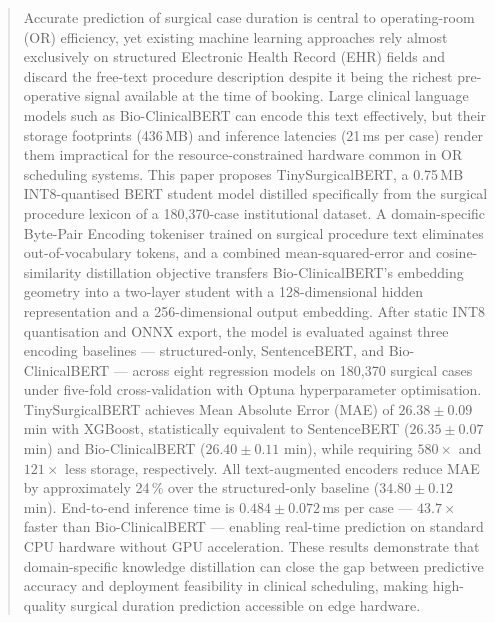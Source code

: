 \documentclass[3p]{elsarticle}
\begin{document}
\begin{frontmatter}
\begin{abstract}
Accurate prediction of surgical case duration is central to operating-room (OR) efficiency, yet existing machine learning approaches rely almost exclusively on structured Electronic Health Record (EHR) fields and discard the free-text procedure description despite it being the richest pre-operative signal available at the time of booking. Large clinical language models such as Bio-ClinicalBERT can encode this text effectively, but their storage footprints (436\,MB) and inference latencies (21\,ms per case) render them impractical for the resource-constrained hardware common in OR scheduling systems. This paper proposes TinySurgicalBERT, a 0.75\,MB INT8-quantised BERT student model distilled specifically from the surgical procedure lexicon of a 180{,}370-case institutional dataset. A domain-specific Byte-Pair Encoding tokeniser trained on surgical procedure text eliminates out-of-vocabulary tokens, and a combined mean-squared-error and cosine-similarity distillation objective transfers Bio-ClinicalBERT's embedding geometry into a two-layer student with a 128-dimensional hidden representation and a 256-dimensional output embedding. After static INT8 quantisation and ONNX export, the model is evaluated against three encoding baselines — structured-only, SentenceBERT, and Bio-ClinicalBERT — across eight regression models on 180{,}370 surgical cases under five-fold cross-validation with Optuna hyperparameter optimisation. TinySurgicalBERT achieves Mean Absolute Error (MAE) of $26.38 \pm 0.09$ min with XGBoost, statistically equivalent to SentenceBERT ($26.35 \pm 0.07$ min) and Bio-ClinicalBERT ($26.40 \pm 0.11$ min), while requiring $580\times$ and $121\times$ less storage, respectively. All text-augmented encoders reduce MAE by approximately 24\,\% over the structured-only baseline ($34.80 \pm 0.12$ min). End-to-end inference time is $0.484 \pm 0.072$\,ms per case — $43.7\times$ faster than Bio-ClinicalBERT — enabling real-time prediction on standard CPU hardware without GPU acceleration. These results demonstrate that domain-specific knowledge distillation can close the gap between predictive accuracy and deployment feasibility in clinical scheduling, making high-quality surgical duration prediction accessible on edge hardware.
\end{abstract}

\begin{graphicalabstract}
\end{graphicalabstract}


\end{frontmatter}
\end{document}
